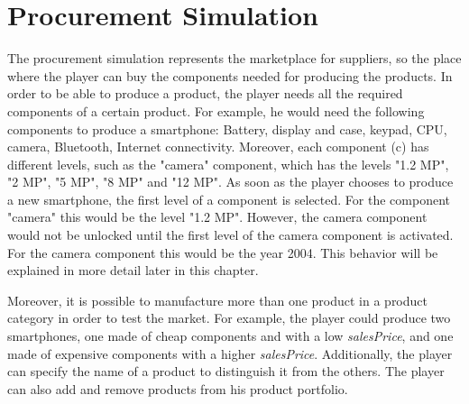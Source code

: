 \section{Procurement Simulation}
\label{procuresim}
The procurement simulation represents the marketplace for suppliers, so  the place where the player can buy the components needed for producing the products. In order to be able to produce a product, the player needs all the required components of a certain product. For example, he would need the following components to produce a smartphone: Battery, display and case, keypad, CPU, camera, Bluetooth, Internet connectivity. Moreover, each component (\gls{c}) has different levels, such as the "camera" component, which has the levels "1.2 MP", "2 MP", "5 MP", "8 MP" and "12 MP".  As soon as the player chooses to produce a new smartphone, the first level of a component is selected. For the component "camera" this would be the level "1.2 MP". However, the camera component would not be unlocked until the first level of the camera component is activated. For the camera component this would be the year 2004. This behavior will be explained in more detail later in this chapter.

Moreover, it is possible to manufacture more than one product in a product category in order to test the market. For example, the player could produce two smartphones, one made of cheap components and with a low \textit{salesPrice}, and one made of expensive components with a higher \textit{salesPrice}. Additionally, the player can specify the name of a product to distinguish it from the others. The player can also add and remove products from his product portfolio.

